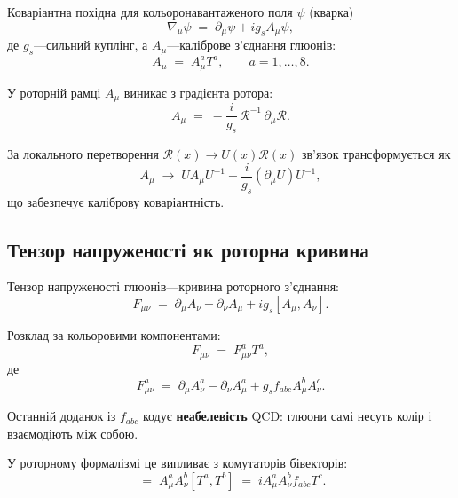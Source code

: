 \documentclass[11pt,a4paper]{article}
\newcommand{\Rotor}{\mathcal{R}}
\newcommand{\D}{\nabla}
\theoremstyle{definition}
\theoremstyle{plain}
\theoremstyle{remark}
\begin{document}
Коваріантна похідна для кольоронавантаженого поля $\psi$ (кварка)
\begin{equation}
\D_\mu \psi \;=\; \partial_\mu \psi + ig_s A_\mu \psi,
\label{eq:covariant-derivative}
\end{equation}
де $g_s$—сильний куплінг, а $A_\mu$—каліброве з’єднання глюонів:
\begin{equation}
A_\mu \;=\; A_\mu^a T^a, \qquad a=1,\ldots,8.
\label{eq:gluon-connection}
\end{equation}

У роторній рамці $A_\mu$ виникає з градієнта ротора:
\begin{equation}
A_\mu \;=\; -\frac{i}{g_s}\,\Rotor^{-1}\,\partial_\mu\Rotor.
\label{eq:rotor-connection}
\end{equation}

За локального перетворення $\Rotor(x)\to U(x)\Rotor(x)$ зв’язок трансформується як
\begin{equation}
A_\mu \;\to\; U A_\mu U^{-1} - \frac{i}{g_s}(\partial_\mu U) U^{-1},
\end{equation}
що забезпечує каліброву коваріантність.

\subsection{Тензор напруженості як роторна кривина}

Тензор напруженості глюонів—кривина роторного з’єднання:
\begin{equation}
F_{\mu\nu} \;=\; \partial_\mu A_\nu - \partial_\nu A_\mu + ig_s [A_\mu, A_\nu].
\label{eq:field-strength}
\end{equation}

Розклад за кольоровими компонентами:
\begin{equation}
F_{\mu\nu} \;=\; F_{\mu\nu}^a T^a,
\end{equation}
де
\begin{equation}
F_{\mu\nu}^a \;=\; \partial_\mu A_\nu^a - \partial_\nu A_\mu^a + g_s f_{abc} A_\mu^b A_\nu^c.
\label{eq:gluon-field-strength}
\end{equation}

Останній доданок із $f_{abc}$ кодує \textbf{неабелевість} QCD: глюони самі несуть колір і взаємодіють між собою.

У роторному формалізмі це випливає з комутаторів бівекторів:
\begin{equation}
[A_\mu,A_\nu] \;=\; A_\mu^a A_\nu^b [T^a,T^b] \;=\; i A_\mu^a A_\nu^b f_{abc} T^c.
\end{equation}
\end{document}
